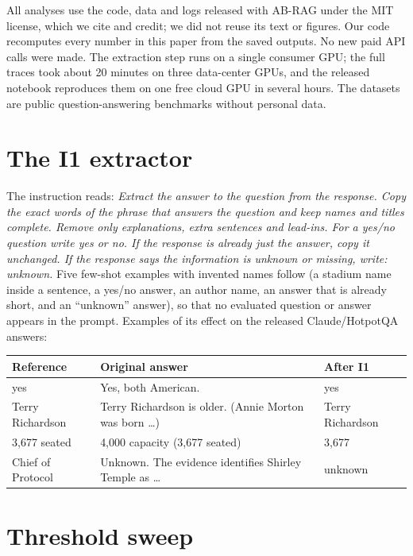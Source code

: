 \documentclass[11pt]{article}
\begin{document}
All analyses use the code, data and logs released with AB-RAG under the MIT license, which we cite and credit; we did not reuse its text or figures. Our code recomputes every number in this paper from the saved outputs. No new paid API calls were made. The extraction step runs on a single consumer GPU; the full traces took about 20 minutes on three data-center GPUs, and the released notebook reproduces them on one free cloud GPU in several hours. The datasets are public question-answering benchmarks without personal data.




\appendix

\section{The I1 extractor}
\label{app:i1}

The instruction reads: \emph{Extract the answer to the question from the response. Copy the exact words of the phrase that answers the question and keep names and titles complete. Remove only explanations, extra sentences and lead-ins. For a yes/no question write yes or no. If the response is already just the answer, copy it unchanged. If the response says the information is unknown or missing, write: unknown.} Five few-shot examples with invented names follow (a stadium name inside a sentence, a yes/no answer, an author name, an answer that is already short, and an ``unknown'' answer), so that no evaluated question or answer appears in the prompt. Examples of its effect on the released Claude/HotpotQA answers:

\begin{center}
\small
\begin{tabular}{lll}
\toprule
Reference & Original answer & After I1 \\
\midrule
yes & Yes, both American. & yes \\
Terry Richardson & Terry Richardson is older. (Annie Morton was born \ldots) & Terry Richardson \\
3,677 seated & 4,000 capacity (3,677 seated) & 3,677 \\
Chief of Protocol & Unknown. The evidence identifies Shirley Temple as \ldots & unknown \\
\bottomrule
\end{tabular}
\end{center}

\section{Threshold sweep}
\label{app:sweep}
\end{document}
